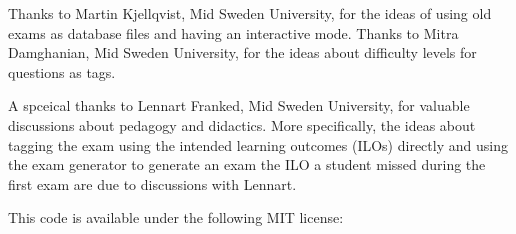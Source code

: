 Thanks to Martin Kjellqvist, Mid Sweden University, for the ideas of using old 
exams as database files and having an interactive mode.
Thanks to Mitra Damghanian, Mid Sweden University, for the ideas about 
difficulty levels for questions as tags.

A spceical thanks to Lennart Franked, Mid Sweden University, for valuable 
discussions about pedagogy and didactics.
More specifically, the ideas about tagging the exam using the intended learning 
outcomes (ILOs) directly and using the exam generator to generate an exam the 
ILO a student missed during the first exam are due to discussions with Lennart.

This code is available under the following MIT license:
\begin{quote}
  
\end{quote}

